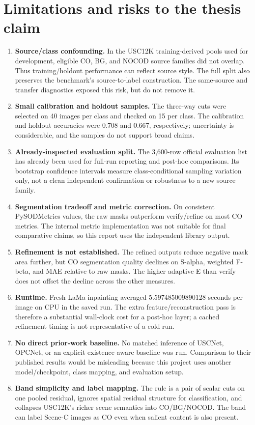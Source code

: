 \documentclass[10pt,a4paper]{article}
\begin{document}
\section{Limitations and risks to the thesis claim}
\begin{enumerate}[leftmargin=2em]
\item \textbf{Source/class confounding.} In the USC12K training-derived pools used for development, eligible CO, BG, and NOCOD source families did not overlap. Thus training/holdout performance can reflect source style. The full split also preserves the benchmark's source-to-label construction. The same-source and transfer diagnostics exposed this risk, but do not remove it.
\item \textbf{Small calibration and holdout samples.} The three-way cuts were selected on 40 images per class and checked on 15 per class. The calibration and holdout accuracies were 0.708 and 0.667, respectively; uncertainty is considerable, and the samples do not support broad claims.
\item \textbf{Already-inspected evaluation split.} The 3,600-row official evaluation list has already been used for full-run reporting and post-hoc comparisons. Its bootstrap confidence intervals measure class-conditional sampling variation only, not a clean independent confirmation or robustness to a new source family.
\item \textbf{Segmentation tradeoff and metric correction.} On consistent PySODMetrics values, the raw masks outperform verify/refine on most CO metrics. The internal metric implementation was not suitable for final comparative claims, so this report uses the independent library output.
\item \textbf{Refinement is not established.} The refined outputs reduce negative mask area further, but CO segmentation quality declines on S-alpha, weighted F-beta, and MAE relative to raw masks. The higher adaptive E than verify does not offset the decline across the other measures.
\item \textbf{Runtime.} Fresh LaMa inpainting averaged 5.597485009890128 seconds per image on CPU in the saved run. The extra feature/reconstruction pass is therefore a substantial wall-clock cost for a post-hoc layer; a cached refinement timing is not representative of a cold run.
\item \textbf{No direct prior-work baseline.} No matched inference of USCNet, OPCNet, or an explicit existence-aware baseline was run. Comparison to their published results would be misleading because this project uses another model/checkpoint, class mapping, and evaluation setup.
\item \textbf{Band simplicity and label mapping.} The rule is a pair of scalar cuts on one pooled residual, ignores spatial residual structure for classification, and collapses USC12K's richer scene semantics into CO/BG/NOCOD. The band can label Scene-C images as CO even when salient content is also present.
\end{enumerate}
\end{document}
